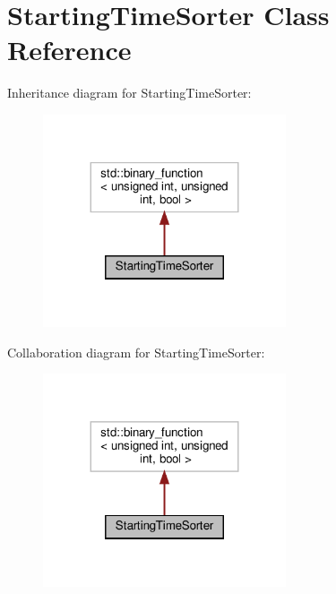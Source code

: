 \hypertarget{classStartingTimeSorter}{}\section{Starting\+Time\+Sorter Class Reference}
\label{classStartingTimeSorter}


Inheritance diagram for Starting\+Time\+Sorter\+:
\nopagebreak
\begin{figure}[H]
\begin{center}
\leavevmode
\includegraphics[width=203pt]{d3/dcd/classStartingTimeSorter__inherit__graph}
\end{center}
\end{figure}


Collaboration diagram for Starting\+Time\+Sorter\+:
\nopagebreak
\begin{figure}[H]
\begin{center}
\leavevmode
\includegraphics[width=203pt]{d6/df7/classStartingTimeSorter__coll__graph}
\end{center}
\end{figure}
